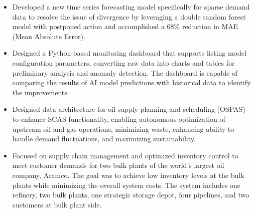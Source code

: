 \documentclass[margin, 10pt]{res} %
\begin{document}
\begin{resume}
\begin{itemize}
    \item Developed a new time series forecasting model specifically for sparse demand data to resolve the issue of divergence by leveraging a double random forest model with postponed action and accomplished a 68\% reduction in MAE (Mean Absolute Error).
    \item Designed a Python-based monitoring dashboard that supports listing model configuration parameters, converting raw data into charts and tables for preliminary analysis and anomaly detection. The dashboard is capable of comparing the results of AI model predictions with historical data to identify the improvements.
    \item Designed data architecture for oil supply planning and scheduling (OSPAS) to enhance SCAS functionality, enabling autonomous optimization of upstream oil and gas operations, minimizing waste, enhancing ability to handle demand fluctuations, and maximizing sustainability.
    \item Focused on supply chain management and optimized inventory control to meet customer demands for two bulk plants of the world's largest oil company, Aramco. The goal was to achieve low inventory levels at the bulk plants while minimizing the overall system costs. The system includes one refinery, two bulk plants, one strategic storage depot, four pipelines, and two customers at bulk plant side.
    


\end{itemize}
\end{resume}
\end{document}
